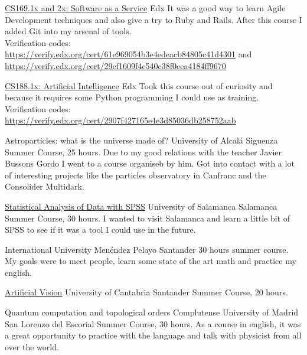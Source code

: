 \documentclass[11pt,a4paper,roman]{moderncv}
\begin{document}
	{\href{https://www.edx.org/courses/BerkeleyX/CS169.1x/2013_Spring/about}
	{CS169.1x and 2x: Software as a Service}}
	{Edx}
	{}
	{}
	{It was a good way to learn Agile Development techniques and also give a try to 
	Ruby and Rails. After this course I added Git into my arsenal of tools. \\ 
	Verification codes: \\ \url{https://verify.edx.org/cert/61e969054b3e4edeacb84805c41d4301} and \\ \url{https://verify.edx.org/cert/29cf1609f4c540c38f0eea4184ff9670}}

	{\href{https://6002x.mitx.mit.edu/}
	{CS188.1x: Artificial Intelligence}}
	{Edx}
	{}
	{}
	{Took this course out of curiosity and because it requires some Python 
	programming I could use as training.\\
	Verification codes: \\ 	\url{https://verify.edx.org/cert/2907f427165e4e3d85036db258752aab}}


	{Astroparticles: what is the universe made of?}
	{University of Alcal\'a}
	{Siguenza}
	{}
	{Summer Course, 25 hours. Due to my good relations with the teacher Javier 
	Bussons Gordo I went to a course organiseb by him. Got into contact with a lot of 
	interesting projects like the particles observatory in Canfranc and the 
	Consolider Multidark.}

	{\href{http://biplot.usal.es/verano/analisis-estadistico-de-dat.html}
	{Statistical Analysis of Data with SPSS}}
	{University of Salamanca}
	{Salamanca}
	{}
	{Summer Course, 30 hours. I wanted to visit Salamanca and learn a little bit of 
	SPSS to see if it was a tool I could use in the future.}

	{International University Men\'endez Pelayo}
	{Santander}
	{}
	{30 hours summer course. My goals were to meet people, learn some state of the 
	art math and practice my english.}

	{\href{http://cursosdeverano.unican.es/cursos-anteriores/Paginas/Detalle-
	curso.aspx?p_id=1094}
	{Artificial Vision}}
	{University of Cantabria}
	{Santander}
	{}
	{Summer Course, 20 hours.}

	{Quantum computation and topological orders}
	{Complutense University of Madrid}
	{San Lorenzo del Escorial}
	{}
	{Summer Course, 30 hours. As a course in english, it was a great opportunity to 
	practice with the language and talk with physicist from all over the world.}
\end{document}
